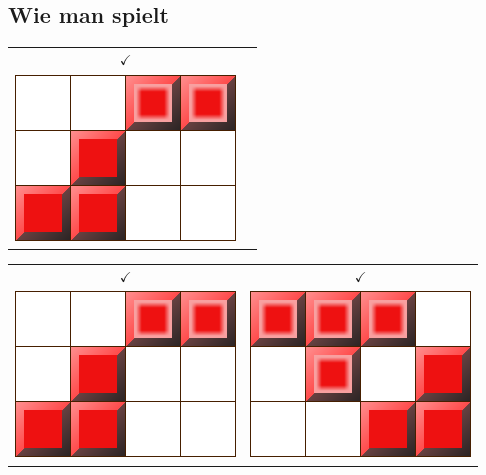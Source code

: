 \documentclass[12pt, draft]{beamer}
\begin{document}
\subsection{Wie man spielt}
\begin{frame}
	\begin{tabular}{c c}
		\huge \color{green} $\checkmark$ & \\
		\includegraphics[width=0.5\linewidth]{media/how2play2.png}
		&
	\end{tabular}
\end{frame}
\begin{frame}
	\begin{tabular}{c c}
		\huge \color{green} $\checkmark$ & \huge \color{green} $\checkmark$\\
		\includegraphics[width=0.5\linewidth]{media/how2play2.png}
		&
		\includegraphics[width=0.5\linewidth]{media/how2play3.png}
	\end{tabular}
\end{frame}
\end{document}
